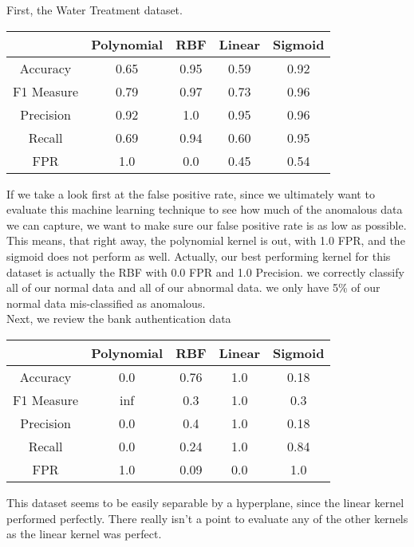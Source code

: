 \documentclass[journal]{IEEEtran}
\begin{document}
First, the Water Treatment dataset.
\begin{center}
 \begin{tabular}{| c | c c c c |} 
 \hline
 \hfill            & Polynomial & RBF & Linear & Sigmoid \\
 \hline\hline
Accuracy    & 0.65 	       & 0.95 & 0.59 & 0.92 \\ 
 \hline
F1 Measure & 0.79 	       & 0.97 & 0.73 & 0.96\\
 \hline
Precision   & 0.92 	       & 1.0   & 0.95 & 0.96\\
 \hline
Recall        & 0.69 	       & 0.94 & 0.60 & 0.95\\
 \hline
FPR           & 1.0 	       & 0.0   & 0.45 & 0.54\\ 
 \hline
\end{tabular}
\end{center}
If we take a look first at the false positive rate, since we ultimately want to evaluate this machine learning technique to see how much of the anomalous data we can capture, we want to make sure our false positive rate is as low as possible. This means, that right away, the polynomial kernel is out, with 1.0 FPR, and the sigmoid does not perform as well. Actually, our best performing kernel for this dataset is actually the RBF with 0.0 FPR and 1.0 Precision. we correctly classify all of our normal data and all of our abnormal data. we only have 5\% of our normal data mis-classified as anomalous.
\hfill\linebreak\\
Next, we review the bank authentication data
\begin{center}
 \begin{tabular}{| c | c c c c |} 
 \hline
 \hfill            & Polynomial & RBF & Linear & Sigmoid \\
 \hline\hline
Accuracy    & 0.0 	       & 0.76 & 1.0 & 0.18 \\ 
 \hline
F1 Measure & inf 	       & 0.3 & 1.0 & 0.3 \\
 \hline
Precision   & 0.0 	       & 0.4   & 1.0 & 0.18\\
 \hline
Recall        & 0.0 	       & 0.24 & 1.0 & 0.84\\
 \hline
FPR           & 1.0 	       & 0.09   & 0.0 & 1.0\\ 
 \hline
\end{tabular}
\end{center}
This dataset seems to be easily separable by a hyperplane, since the linear kernel performed perfectly. There really isn't a point to evaluate any of the other kernels as the linear kernel was perfect.
\end{document}
